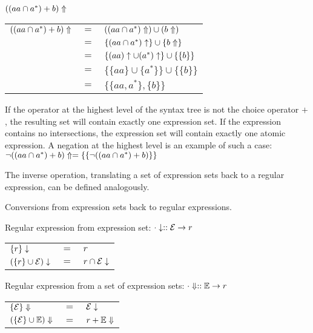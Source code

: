 \needspace{2cm}
\begin{eg}
   $((aa \cap a^*) + b)\Uparrow$

   \begin{tabular}{lll}
      $((aa \cap a^*) + b)\Uparrow$
      & $=$	& $((aa \cap a^*)\Uparrow) \cup (b\Uparrow)$		\\
      & $=$	& $\{(aa \cap a^*)\uparrow\} \cup \{b\Uparrow\}$		\\
      & $=$	& $\{(aa)\uparrow \cup (a^*)\uparrow\} \cup \{\{b\}\}$	\\
      & $=$	& $\{\{aa\} \cup \{a^*\}\} \cup \{\{b\}\}$			\\
      & $=$	& $\{\{aa, a^*\}, \{b\}\}$					\\
   \end{tabular}
\end{eg}

If the operator at the highest level of the syntax tree is not the choice
operator $+$, the resulting set will contain exactly one expression set. If the
expression contains no intersections, the expression set will contain exactly
one atomic expression. A negation at the highest level is an example of such a
case: $\neg((aa \cap a^*) + b)\Uparrow = \{\{\neg((aa \cap a^*) + b)\}\}$

The inverse operation, translating a set of expression sets back to a regular
expression, can be defined analogously.

\begin{defn}
   \label{defn-esets2re}
   Conversions from expression sets back to regular expressions.

   Regular expression from expression set: $\cdot\downarrow :: \mathcal{E} \to r$

   \begin{tabular}{lll}
      $\{r\}\downarrow$			& $=$	& $r$				\\
      $(\{r\} \cup \mathcal{E})\downarrow$	& $=$	& $r \cap \mathcal{E}\downarrow$	\\
   \end{tabular}

   Regular expression from a set of expression sets: $\cdot\Downarrow :: \mathbb{E} \to r$

   \begin{tabular}{lll}
      $\{\mathcal{E}\}\Downarrow$		& $=$	& $\mathcal{E}\downarrow$		\\
      $(\{\mathcal{E}\} \cup \mathbb{E})\Downarrow$	& $=$	& $r + \mathbb{E}\Downarrow$	\\
   \end{tabular}
\end{defn}

